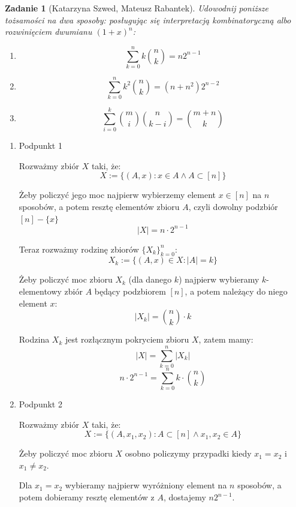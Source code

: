 \documentclass{mwart}
\newtheorem{zad}{Zadanie}[section]
\begin{document}
\begin{zad}[Katarzyna Szwed, Mateusz Rabantek]
    Udowodnij poniższe tożsamości na dwa sposoby: posługując się interpretacją
    kombinatoryczną albo rozwinięciem dwumianu $(1 + x)^n$:
    \begin{enumerate}
        \item \[\sum_{k=0}^{n}k\binom{n}{k} = n2^{n-1}\]
        \item \[\sum_{k=0}^{n}k^2\binom{n}{k}= (n+n^2)2^{n-2}\]
        \item \[\sum_{i=0}^{k}\binom{m}{i}\binom{n}{k-i} = \binom{m+n}{k} \]
    \end{enumerate}
\end{zad}
\begin{mdframed}
    \begin{enumerate}
        \item Podpunkt 1

              Rozważmy zbiór $X$ taki, że:
              \[X := \{ (A, x) : x \in A \wedge A \subset [n]\}\]

              Żeby policzyć jego moc najpierw wybierzemy element $x \in [n]$ na $n$ sposobów,
              a potem resztę elementów zbioru $A$, czyli dowolny podzbiór $[n]-\{x\}$
              \[|X| = n \cdot 2^{n-1}\]

              Teraz rozważmy rodzinę zbiorów $\{X_k\}_{k=0}^n$:
              \[X_k := \{(A, x) \in X : |A| = k\}\]

              Żeby policzyć moc zbioru $X_k$ (dla danego $k$) najpierw wybieramy $k$-elementowy zbiór $A$ będący podzbiorem $[n]$, a potem należący
              do niego element $x$:
              \[|X_k| = {n \choose k} \cdot k\]

              Rodzina $X_k$ jest rozłącznym pokryciem zbioru $X$, zatem mamy:
              \[|X| = \sum_{k=0}^{n} |X_k|\]
              \[n \cdot 2^{n-1} = \sum_{k=0}^{n} k \cdot {n \choose k}\]

        \item Podpunkt 2

              Rozważmy zbiór $X$ taki, że:
              \[X := \{(A, x_1, x_2) : A \subset [n] \wedge x_1, x_2 \in A\}\]

              Żeby policzyć moc zbioru $X$ osobno policzymy przypadki kiedy $x_1 = x_2$ i $x_1 \neq x_2$.

              Dla $x_1 = x_2$ wybieramy najpierw wyróżniony element na $n$ sposobów, a potem dobieramy resztę elementów z $A$,
              dostajemy $n2^{n-1}$.


\end{enumerate}
\end{mdframed}
\end{document}
